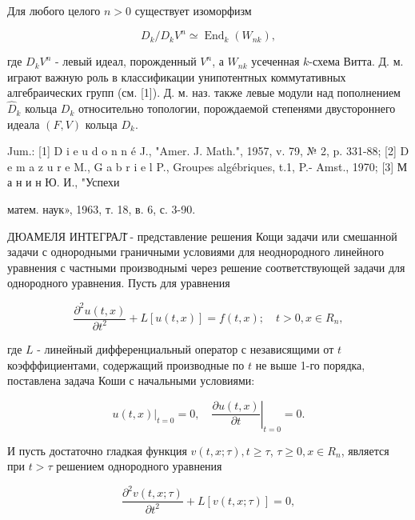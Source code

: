 \documentclass[10pt]{article}
\begin{document}
Для любого целого $n>0$ существует изоморфизм



\[

D_{k} / D_{k} V^{n} \simeq \operatorname{End}_{k}\left(W_{n k}\right),

\]



где $D_{k} V^{n}$ - левый идеал, порожденный $V^{n}$, а $W_{n k}$ усеченная $k$-схема Витта. Д. м. играют важную роль в классификации унипотентных коммутативных алгебраических групп (см. [1]). Д. м. наз. также левые модули над пополнением $\hat{D}_{k}$ кольца $D_{k}$ относительно топологии, порождаемой степенями двустороннего идеала $(F, V)$ кольца $D_{k}$.



Jum.: [1] D i e u d o n n é J., "Amer. J. Math.", 1957, v. 79, № 2, p. 331-88; [2] D e m a z u r e M., G a b r i e l P., Groupes algébriques, t.1, P.- Amst., 1970; [3] М а н и н Ю. И., "Успехи

матем. наук», 1963, т. 18, в. 6, с. 3-90.



ДЮАМЕЛЯ ИНТЕГРАЛ̆ - представление решения Кощи задачи или смешанной задачи с однородными граничными условиями для неоднородного линейного уравнения с частными производнымі через решение соответствующей задачи для однородного уравнения. Пусть для уравнения



\[

\frac{\partial^{2} u(t, x)}{\partial t^{2}}+L[u(t, x)]=f(t, x) ; \quad t>0, x \in R_{n},

\]



где $L$ - линейный дифференциальный оператор с независящими от $t$ коэфффициентами, содержащий производные по $t$ не выше 1-го порядка, поставлена задача Коши с начальными условиями:



\[

\left.u(t, x)\right|_{t=0}=0,\left.\quad \frac{\partial u(t, x)}{\partial t}\right|_{t=0}=0 .

\]



И пусть достаточно гладкая функция $v(t, x ; \tau), t \geqslant \tau$, $\tau \geqslant 0, x \in R_{n}$, является при $t>\tau$ решением однородного уравнения



\[

\frac{\partial^{2} v(t, x ; \tau)}{\partial t^{2}}+L[v(t, x ; \tau)]=0,

\]
\end{document}
